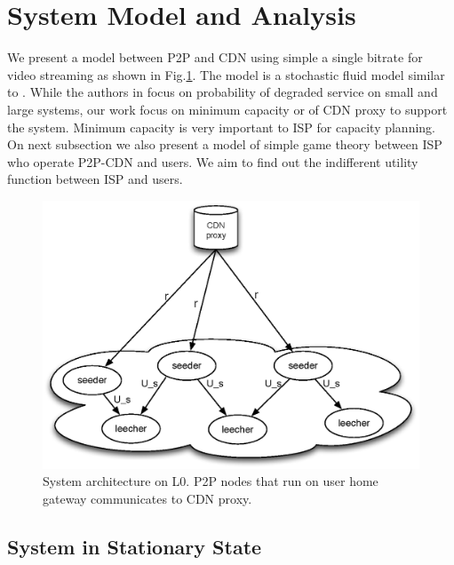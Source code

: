 \documentclass[paper]{ieice}
\begin{document}
  
 
\section{System Model and Analysis}\label{systemmodel}
We present a model between P2P and CDN using simple a single bitrate for video streaming as shown in Fig.\ref{fig:twotier2}. 
The model is a stochastic fluid model similar to \cite{4215694}.
While the authors in \cite{4215694} focus on probability of degraded service on small and large systems, our work focus on minimum capacity or of CDN proxy to support the system.
Minimum capacity is very important to ISP for capacity planning.
On next subsection we also present a model of simple game theory between ISP who operate P2P-CDN and users.
We aim to find out the indifferent utility function between ISP and users.

\begin{figure}[tb] 
\begin{center}
\includegraphics[scale=0.4]{graphs/two-tier-cdn-topology-2.eps}
\end{center}
\caption{System architecture on L0. P2P nodes that run on user home gateway communicates to CDN proxy.}
\label{fig:twotier2}
\vspace{-2mm}
\end{figure}

\subsection{System in Stationary State}
\end{document}
